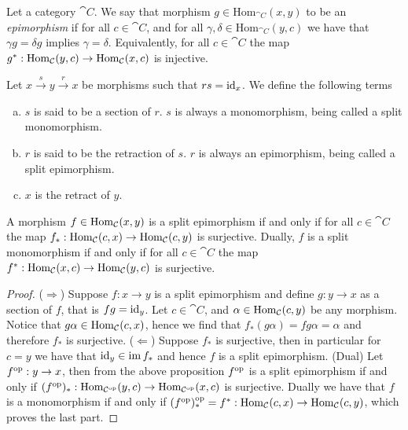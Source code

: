 \begin{definition}[Epimorphism]\label{def: epimorphism}
  Let a category \(\cat C\). We say that morphism \(g \in \mathrm{Hom}_{\cat
  C}(x, y)\) to be an \emph{epimorphism} if for all \(c \in \cat{C}\), and for
  all \(\gamma, \delta \in \mathrm{Hom}_{\cat C}(y, c)\) we have that \(\gamma g
  = \delta g\) implies \(\gamma = \delta\). Equivalently, for all \(c \in \cat
  C\) the map \(g^*: \operatorname{Hom}_{\mathcal C}(y, c)\to \operatorname{Hom}_{\mathcal C}(x, c)\) is injective.
\end{definition}

\begin{definition}
  Let \(x \xrightarrow s y \xrightarrow r x\) be morphisms such that \(r s =
  \operatorname{id}_x\). We define the following terms
  \begin{enumerate}[(a)]
    \item\label{def: split monomorphism}
      \(s\) is said to be a section of \(r\). \(s\) is always a monomorphism,
      being called a split monomorphism.
    \item\label{def: split epimorphism}
      \(r\) is said to be the retraction of \(s\). \(r\) is always an
      epimorphism, being called a split epimorphism.
    \item\label{def: retract}
      \(x\) is the retract of \(y\).
  \end{enumerate}
\end{definition}

\begin{proposition}
  A morphism \(f \in \operatorname{Hom}_{\mathcal C}(x, y)\) is a split epimorphism if and only if
  for all \(c \in \cat C\) the map \(f_*: \operatorname{Hom}_{\mathcal C}(c, x) \to \operatorname{Hom}_{\mathcal
    C}(c, y)\) is surjective. Dually, \(f\) is a split monomorphism if and only
    if for all \(c \in \cat C\) the map \(f^*: \operatorname{Hom}_{\mathcal C}(x, c) \to
    \operatorname{Hom}_{\mathcal C}(y, c)\) is surjective.
\end{proposition}

\begin{proof}
  (\(\Rightarrow\)) Suppose \(f: x \to y\) is a split epimorphism and define
  \(g: y \to x\) as a section of \(f\), that is \(f g = \operatorname{id}_y\). Let \(c
  \in \cat C\), and \(\alpha \in \operatorname{Hom}_{\mathcal C}(c, y)\) be any morphism. Notice
  that \(g \alpha \in \operatorname{Hom}_{\mathcal C}(c, x)\), hence we find that \(f_*(g
  \alpha) = f g \alpha = \alpha\) and therefore \(f_*\) is
  surjective. (\(\Leftarrow\)) Suppose \(f_*\) is surjective, then in particular
  for \(c = y\) we have that \(\operatorname{id}_y \in \operatorname{im} f_*\) and hence \(f\) is a split
  epimorphism. (Dual) Let \(f^{\mathrm{op}}: y \to x\), then from the above proposition
  \(f^{\mathrm{op}}\) is a split epimorphism if and only if \((f^{\mathrm{op}})_*: \operatorname{Hom}_{\mathcal
  C^{\mathrm{op}}}(y, c) \to \operatorname{Hom}_{\mathcal C^{\mathrm{op}}}(x, c)\) is surjective. Dually we have that
  \(f\) is a monomorphism if and only if \((f^{\mathrm{op}})_*^{\mathrm{op}} = f^*: \operatorname{Hom}_{\mathcal C}(c,
  x) \to \operatorname{Hom}_{\mathcal C}(c, y)\), which proves the last part.
\end{proof}

